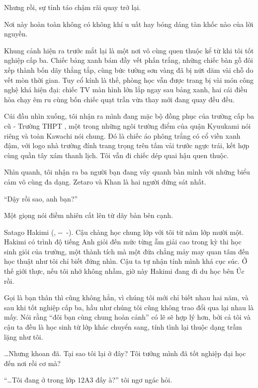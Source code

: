 \documentclass[../main.tex]{subfiles}
\begin{document}
Nhưng rồi, sự tỉnh táo chậm rãi quay trở lại.

Nơi này hoàn toàn không có không khí u uất hay bóng dáng tàn khốc nào của lời nguyền.

Khung cảnh hiện ra trước mắt lại là một nơi vô cùng quen thuộc kể từ khi tôi tốt nghiệp cấp ba. Chiếc bảng xanh bám đầy vết phấn trắng, những chiếc bàn gỗ đôi xếp thành bốn dãy thẳng tắp, cùng bức tường sơn vàng đã bị nứt dăm vài chỗ do vết mòn thời gian. Tuy cổ kính là thế, phòng học vẫn được trang bị vài món công nghệ khá hiện đại: chiếc TV màn hình lớn lắp ngay sau bảng xanh, hai cái điều hòa chạy êm ru cùng bốn chiếc quạt trần vừa thay mới đang quay đều đều.

Cúi đầu nhìn xuống, tôi nhận ra mình đang mặc bộ đồng phục của trường cấp ba cũ - Trường THPT , một trong những ngôi trường điểm của quận Kyuukami nói riêng và toàn Kawachi nói chung. Đó là chiếc áo phông trắng có cổ viền xanh đậm, với logo nhà trường đính trang trọng trên tấm vải trước ngực trái, kết hợp cùng quần tây xám thanh lịch. Tôi vẫn đi chiếc dép quai hậu quen thuộc.

Nhìn quanh, tôi nhận ra ba người bạn đang vây quanh bàn mình với những biểu cảm vô cùng đa dạng. Zetaro và Khan là hai người đứng sát nhất.

``Dậy rồi sao, anh bạn?''

Một giọng nói điềm nhiên cất lên từ dãy bàn bên cạnh.

Satago Hakimi (, --\ -). Cậu chàng học chung lớp với tôi từ năm lớp mười một. Hakimi có trình độ tiếng Anh giỏi đến mức từng ẵm giải cao trong kỳ thi học sinh giỏi của trường, một thành tích mà một đứa chẳng mảy may quan tâm đến học thuật như tôi chỉ biết đứng nhìn. Cậu ta tự nhận tính mình khá cục súc. Ở thế giới thực, nếu tôi nhớ không nhầm, giờ này Hakimi đang đi du học bên Úc rồi.

Gọi là bạn thân thì cũng không hẳn, vì chúng tôi mới chỉ biết nhau hai năm, và sau khi tốt nghiệp cấp ba, hầu như chúng tôi cũng không trao đổi qua lại nhau là mấy. Nói rằng ``đôi bạn cùng chung hoàn cảnh'' có lẽ sẽ hợp lý hơn, bởi cả tôi và cậu ta đều là học sinh từ lớp khác chuyển sang, tính tình lại thuộc dạng trầm lặng như tôi.

\dots Nhưng khoan đã. Tại sao tôi lại ở đây? Tôi tưởng mình đã tốt nghiệp đại học đến nơi rồi cơ mà?

``\dots Tôi đang ở trong lớp 12A3 đấy à?'' tôi ngơ ngác hỏi.
\end{document}
